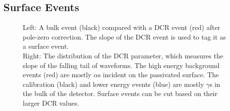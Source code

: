 \documentclass[/main.tex]{subfiles}
\begin{document}
\subsection{Surface Events} \label{sec:dcr}
\begin{figure}
  \centering
  \caption[Surface alpha cut]{\label{fig:dcr}
    Left: A bulk event (black) compared with a DCR event (red) after pole-zero correction. The slope of the DCR event is used to tag it as a surface event.\\
    Right: The distribution of the DCR parameter, which measures the slope of the falling tail of waveforms. The high energy background events (red) are mostly $\alpha$s incident on the passivated surface. The calibration (black) and lower energy events (blue) are mostly $\gamma$s in the bulk of the detector. Surface events can be cut based on their larger DCR values.
  }
\end{figure}
\end{document}
